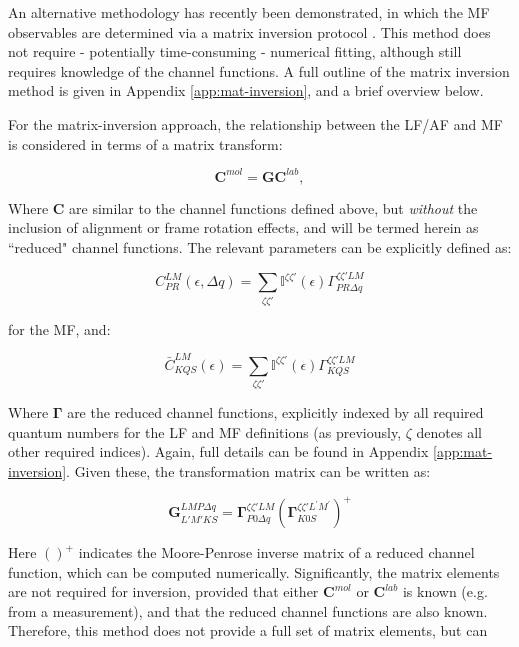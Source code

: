 An alternative methodology has recently been demonstrated, in which the MF observables are determined via a matrix inversion protocol \cite{gregory2021MolecularFramePhotoelectron}. This method does not require - potentially time-consuming - numerical fitting, although still requires knowledge of the channel functions. A full outline of the matrix inversion method is given in Appendix \ref{app:mat-inversion}, and a brief overview below.

For the matrix-inversion approach, the relationship between the LF/AF and MF is considered in terms of a matrix transform:

\begin{equation}
\mathbf{C}^{mol}=\mathbf{G}\mathbf{C}^{lab},\label{eq:basic}
\end{equation}

Where $\mathbf{C}$ are similar to the channel functions defined above, but \textit{without} the inclusion of alignment or frame rotation effects, and will be termed herein as ``reduced" channel functions. The relevant parameters can be explicitly defined as:

\begin{equation}
C_{PR}^{LM}(\epsilon,\Delta q)=\sum_{\zeta\zeta'}\mathbb{I}^{\zeta\zeta'}(\epsilon)\Gamma_{PR\Delta q}^{\zeta\zeta'LM}
\end{equation}

for the MF, and:

\begin{equation}
\bar{C}_{KQS}^{LM}(\epsilon)=\sum_{\zeta\zeta'}\mathbb{I}^{\zeta\zeta'}(\epsilon)\Gamma_{KQS}^{\zeta\zeta'LM}
\end{equation}

Where $\mathbf{\Gamma}$ are the reduced channel functions, explicitly indexed by all required quantum numbers for the LF and MF definitions (as previously, $\zeta$ denotes all other required indices). Again, full details can be found in Appendix \ref{app:mat-inversion}. Given these, the transformation matrix can be written as:

\begin{equation}
\mathbf{G}_{L'M'KS}^{LMP\Delta q}=\mathbf{\Gamma}_{P0\Delta q}^{\zeta\zeta'LM}(\mathbf{\Gamma}_{K0S}^{\zeta\zeta'L^{\prime}M^{\prime}})^{+}
\end{equation}

Here $()^{+}$ indicates the Moore-Penrose inverse matrix of a reduced channel function, which can be computed numerically. Significantly, the matrix elements are not required for inversion, provided that either $\mathbf{C}^{mol}$ or $\mathbf{C}^{lab}$ is known (e.g. from a measurement), and that the reduced channel functions are also known. Therefore, this method does not provide a full set of matrix elements, but can 


